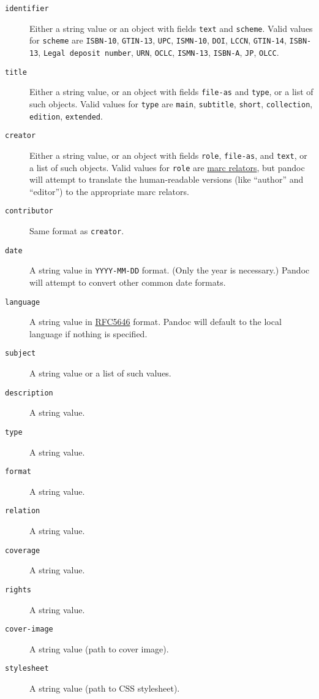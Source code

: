 \documentclass[]{article}
\begin{document}
\begin{description}
\item[\texttt{identifier}]
Either a string value or an object with fields \texttt{text} and
\texttt{scheme}. Valid values for \texttt{scheme} are \texttt{ISBN-10},
\texttt{GTIN-13}, \texttt{UPC}, \texttt{ISMN-10}, \texttt{DOI},
\texttt{LCCN}, \texttt{GTIN-14}, \texttt{ISBN-13},
\texttt{Legal deposit number}, \texttt{URN}, \texttt{OCLC},
\texttt{ISMN-13}, \texttt{ISBN-A}, \texttt{JP}, \texttt{OLCC}.
\item[\texttt{title}]
Either a string value, or an object with fields \texttt{file-as} and
\texttt{type}, or a list of such objects. Valid values for \texttt{type}
are \texttt{main}, \texttt{subtitle}, \texttt{short},
\texttt{collection}, \texttt{edition}, \texttt{extended}.
\item[\texttt{creator}]
Either a string value, or an object with fields \texttt{role},
\texttt{file-as}, and \texttt{text}, or a list of such objects. Valid
values for \texttt{role} are
\href{http://www.loc.gov/marc/relators/relaterm.html}{marc relators},
but pandoc will attempt to translate the human-readable versions (like
``author'' and ``editor'') to the appropriate marc relators.
\item[\texttt{contributor}]
Same format as \texttt{creator}.
\item[\texttt{date}]
A string value in \texttt{YYYY-MM-DD} format. (Only the year is
necessary.) Pandoc will attempt to convert other common date formats.
\item[\texttt{language}]
A string value in \href{http://tools.ietf.org/html/rfc5646}{RFC5646}
format. Pandoc will default to the local language if nothing is
specified.
\item[\texttt{subject}]
A string value or a list of such values.
\item[\texttt{description}]
A string value.
\item[\texttt{type}]
A string value.
\item[\texttt{format}]
A string value.
\item[\texttt{relation}]
A string value.
\item[\texttt{coverage}]
A string value.
\item[\texttt{rights}]
A string value.
\item[\texttt{cover-image}]
A string value (path to cover image).
\item[\texttt{stylesheet}]
A string value (path to CSS stylesheet).
\end{description}
\end{document}
